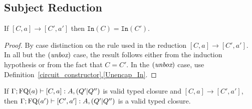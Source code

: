 \documentclass[twoside]{article}
\begin{document}
\subsection{Subject Reduction}

\begin{lemma}
\label{Inwires}
If $[C,a]\to[C',a']$ then $\mathtt{In}(C)=\mathtt{In}(C')$.
\end{lemma}

\begin{proof}
By case distinction on the rule used in the reduction $[C,a]\to[C',a']$. 
In all but the $(\mathop{\textit{unbox}}\nolimits)$ case, the result follows either from the induction 
hypothesis or from the fact that $C=C'$. In the $(\mathop{\textit{unbox}}\nolimits)$ case, use 
Definition~\hyperref[Unencap_In]{\ref*{circuit_constructor}.\ref*{Unencap_In}}.
\end{proof}

\begin{proposition}
\label{subject_red_one_step}
If $\Gamma;\mathop{\textrm{FQ}}\nolimits(a)\vdash [C,a]:A,(Q'|Q'')$ is valid typed closure 
and $[C,a]\to [C',a']$, then $\Gamma;\mathop{\textrm{FQ}}\nolimits(a')\vdash [C',a']:A,(Q'|Q'')$ is 
a valid typed closure.
\end{proposition}
\end{document}
